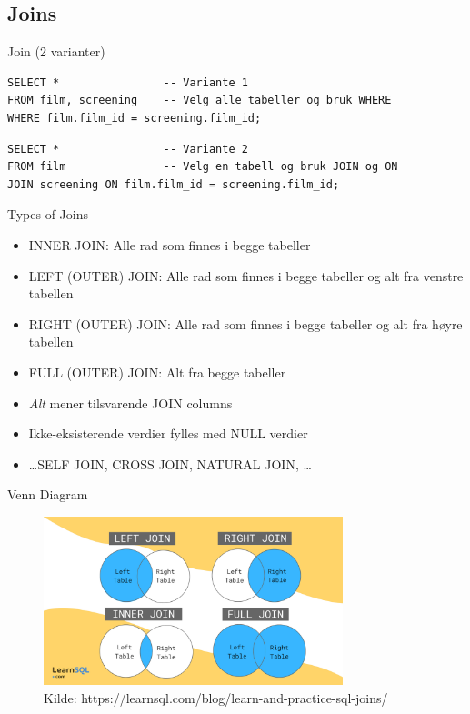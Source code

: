 \subsection*{Joins}
\begin{frame}[fragile]{Join (2 varianter)}
\begin{verbatim}
SELECT *                -- Variante 1
FROM film, screening    -- Velg alle tabeller og bruk WHERE
WHERE film.film_id = screening.film_id;
\end{verbatim}
\pause
\begin{verbatim}
SELECT *                -- Variante 2
FROM film               -- Velg en tabell og bruk JOIN og ON
JOIN screening ON film.film_id = screening.film_id;
\end{verbatim}
\end{frame}

\begin{frame}{Types of Joins}
\begin{itemize}[<+->]
    \item INNER JOIN: Alle rad som finnes i begge tabeller
    \item LEFT (OUTER) JOIN: Alle rad som finnes i begge tabeller og alt fra venstre tabellen
    \item RIGHT (OUTER) JOIN: Alle rad som finnes i begge tabeller og alt fra høyre tabellen
    \item FULL (OUTER) JOIN: Alt fra begge tabeller
    \item \textit{Alt} mener tilsvarende JOIN columns
    \item Ikke-eksisterende verdier fylles med NULL verdier
    \item \dots SELF JOIN, CROSS JOIN, NATURAL JOIN, \dots
\end{itemize}
\end{frame}

\begin{frame}{Venn Diagram}
    \begin{figure}
        \centering
        \includegraphics[height = 4.9cm]{images/joins.png}
        \caption{Kilde:
        https://learnsql.com/blog/learn-and-practice-sql-joins/}
        \label{fig:venndiagram}
    \end{figure}
\end{frame}

